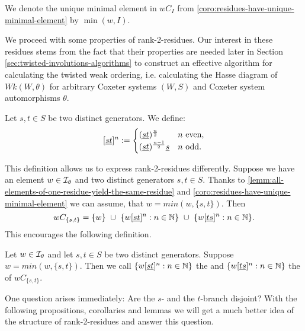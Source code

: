 \begin{defi}
	We denote the unique minimal element in $wC_I$ from \ref{coro:residues-have-unique-minimal-element} by $\min(w,I)$.
\end{defi}

We proceed with some properties of rank-2-residues. Our interest in these residues stems from the fact that their properties are needed later in Section \ref{sec:twisted-involutions-algorithms} to construct an effective algorithm for calculating the twisted weak ordering, i.e. calculating the Hasse diagram of $Wk(W,\theta)$ for arbitrary Coxeter systems $(W,S)$ and Coxeter system automorphisms $\theta$.

\begin{defi}
	Let $s,t \in S$ be two distinct generators. We define:
	$$[\underline{s} \underline{t}]^n :=
	\begin{cases}
	(\underline{s} \underline{t})^{\frac{n}{2}} & n \textrm{ even}, \\
	(\underline{s} \underline{t})^{\frac{n-1}{2}} \underline{s} & n \textrm{ odd}. 
	\end{cases}$$
\end{defi}

This definition allows us to express rank-2-residues differently. Suppose we have an element $w \in \mathcal{I}_{\theta}$ and two distinct generators $s,t \in S$. Thanks to \ref{lemm:all-elements-of-one-residue-yield-the-same-residue} and \ref{coro:residues-have-unique-minimal-element} we can assume, that $w = min(w,\{s,t\})$. Then
$$ wC_{\{s,t\}} = \{ w \} \ \cup \ \{ w [\underline{s} \underline{t}]^n : n \in \mathbb{N} \} \ \cup \ \{ w [\underline{t} \underline{s}]^n : n \in \mathbb{N} \}. $$
This encourages the following definition.

\begin{defi}
	Let $w \in \mathcal{I}_{\theta}$ and let $s,t \in S$ be two distinct generators. Suppose $w = min(w,\{s,t\})$. Then we call $\{ w [\underline{s} \underline{t}]^n : n \in \mathbb{N} \}$ the  and $\{ w [\underline{t} \underline{s}]^n : n \in \mathbb{N} \}$ the  of $wC_{\{s,t\}}$.
\end{defi}

One question arises immediately: Are the $s$- and the $t$-branch disjoint? With the following propositions, corollaries and lemmas we will get a much better idea of the structure of rank-2-residues and answer this question.

